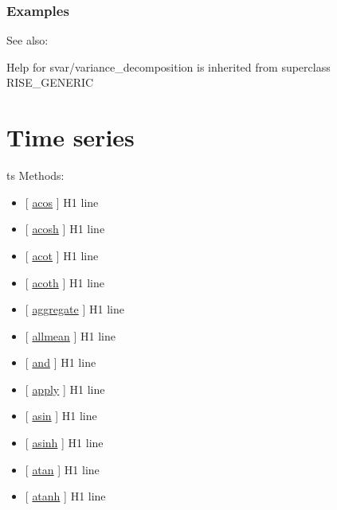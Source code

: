 \documentclass[letterpaper,10pt,english]{sphinxmanual}
\begin{document}
\subsection{Examples}
\label{classes/models/@svar/svar:id176}
See also:

Help for svar/variance\_decomposition is inherited from superclass RISE\_GENERIC


\chapter{Time series}
\label{classes/time_series/@ts/ts:time-series}\label{classes/time_series/@ts/ts::doc}
ts Methods:
\begin{itemize}
\item {} 
{[} {\hyperref[classes/time_series/@ts/ts:acos]{acos}} {]}   H1 line

\item {} 
{[} {\hyperref[classes/time_series/@ts/ts:acosh]{acosh}} {]}   H1 line

\item {} 
{[} {\hyperref[classes/time_series/@ts/ts:acot]{acot}} {]}   H1 line

\item {} 
{[} {\hyperref[classes/time_series/@ts/ts:acoth]{acoth}} {]}   H1 line

\item {} 
{[} {\hyperref[classes/time_series/@ts/ts:aggregate]{aggregate}} {]}   H1 line

\item {} 
{[} {\hyperref[classes/time_series/@ts/ts:allmean]{allmean}} {]}   H1 line

\item {} 
{[} {\hyperref[classes/time_series/@ts/ts:and]{and}} {]}   H1 line

\item {} 
{[} {\hyperref[classes/time_series/@ts/ts:apply]{apply}} {]}   H1 line

\item {} 
{[} {\hyperref[classes/time_series/@ts/ts:asin]{asin}} {]}   H1 line

\item {} 
{[} {\hyperref[classes/time_series/@ts/ts:asinh]{asinh}} {]}   H1 line

\item {} 
{[} {\hyperref[classes/time_series/@ts/ts:atan]{atan}} {]}   H1 line

\item {} 
{[} {\hyperref[classes/time_series/@ts/ts:atanh]{atanh}} {]}   H1 line


\end{itemize}
\end{document}
